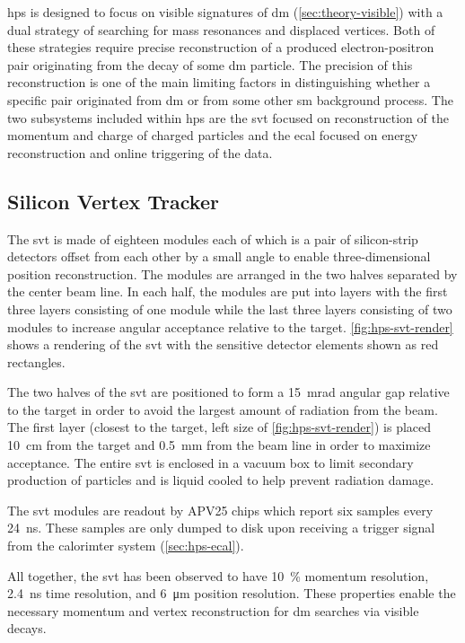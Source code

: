 \ac{hps} is designed to focus on visible signatures of \ac{dm} (\cref{sec:theory-visible}) with
a dual strategy of searching for mass resonances and displaced vertices. Both of these strategies
require precise reconstruction of a produced electron-positron pair originating from the decay of
some \ac{dm} particle. The precision of this reconstruction is one of the main limiting factors
in distinguishing whether a specific pair originated from \ac{dm} or from some other \ac{sm}
background process. The two subsystems included within \ac{hps} are the \ac{svt} focused
on reconstruction of the momentum and charge of charged particles
and the \ac{ecal} focused on energy reconstruction and online triggering of the data.

\subsection{Silicon Vertex Tracker}
The \ac{svt} is made of eighteen modules each of which is a pair of silicon-strip detectors
offset from each other by a small angle to enable three-dimensional position reconstruction.
The modules are arranged in the two halves separated by the center beam line. In each half,
the modules are put into layers with the first three layers consisting of one module while
the last three layers consisting of two modules to increase angular acceptance relative
to the target. \cref{fig:hps-svt-render} shows a rendering of the \ac{svt} with the sensitive
detector elements shown as red rectangles.

The two halves of the \ac{svt} are positioned to form a \qty{15}{\milli\radian} angular gap relative
to the target in order to avoid the largest amount of radiation from the beam. The first layer
(closest to the target, left size of \cref{fig:hps-svt-render}) is placed \qty{10}{\cm} from
the target and \qty{0.5}{\mm} from the beam line in order to maximize acceptance. The entire
\ac{svt} is enclosed in a vacuum box to limit secondary production of particles and is liquid
cooled to help prevent radiation damage.

The \ac{svt} modules are readout by APV25 chips which report six samples every \qty{24}{\ns}.
These samples are only dumped to disk upon receiving a trigger signal from the calorimter
system (\cref{sec:hps-ecal}).

All together, the \ac{svt} has been observed to have \num{10}~\% momentum resolution,
\qty{2.4}{\ns} time resolution, and \qty{6}{\micro\meter} position resolution. These
properties enable the necessary momentum and vertex reconstruction for \ac{dm} searches
via visible decays.

